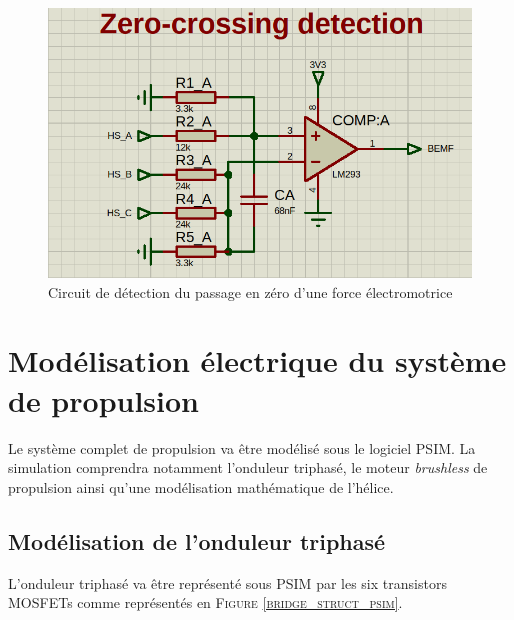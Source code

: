 		\begin{figure}[h]
			\begin{center}
				\includegraphics[scale=0.25]{../Illus/bemf_comp.png}
			\end{center}
			\vspace{-1.5em}
			\caption{Circuit de détection du passage en zéro d'une force
			électromotrice}
			\label{bemf_comp}
		\end{figure}
		
	\newpage
				 
	\section{Modélisation électrique du système de propulsion}
			
	Le système complet de propulsion va être modélisé sous le logiciel \textsc{PSIM}.
	La simulation comprendra notamment l'onduleur triphasé, le moteur \textit{brushless} 
	de propulsion ainsi qu'une modélisation mathématique de l'hélice.
	
		\vspace{-1em}
			
		\subsection{Modélisation de l'onduleur triphasé} 
		
		L'onduleur triphasé va être représenté sous \textsc{PSIM} par
		les six transistors MOSFETs comme représentés en 
		\textsc{Figure \ref{bridge_struct_psim}}.
		
